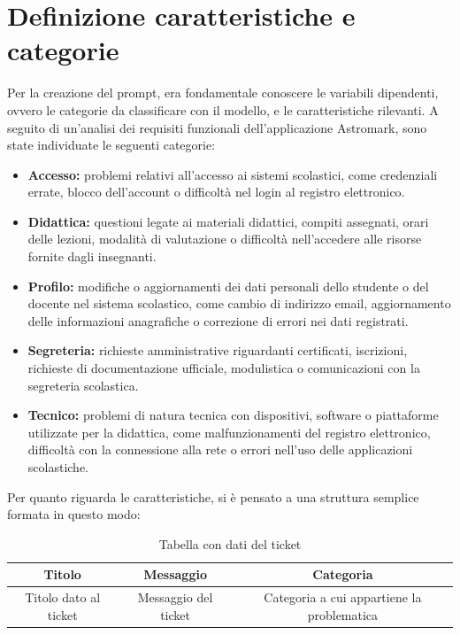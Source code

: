 \section{Definizione caratteristiche e categorie}
Per la creazione del prompt, era fondamentale conoscere le variabili dipendenti, ovvero le categorie da classificare con il modello, e le caratteristiche rilevanti. A seguito di un'analisi dei requisiti funzionali dell'applicazione Astromark, sono state individuate le seguenti categorie:
\begin{itemize}
    \item \textbf{Accesso:} problemi relativi all'accesso ai sistemi scolastici, come credenziali errate, blocco dell'account o difficoltà nel login al registro elettronico.
    \item \textbf{Didattica:} questioni legate ai materiali didattici, compiti assegnati, orari delle lezioni, modalità di valutazione o difficoltà nell'accedere alle risorse fornite dagli insegnanti.
    \item \textbf{Profilo:} modifiche o aggiornamenti dei dati personali dello studente o del docente nel sistema scolastico, come cambio di indirizzo email, aggiornamento delle informazioni anagrafiche o correzione di errori nei dati registrati.
    \item \textbf{Segreteria:}  richieste amministrative riguardanti certificati, iscrizioni, richieste di documentazione ufficiale, modulistica o comunicazioni con la segreteria scolastica.
    \item \textbf{Tecnico:} problemi di natura tecnica con dispositivi, software o piattaforme utilizzate per la didattica, come malfunzionamenti del registro elettronico, difficoltà con la connessione alla rete o errori nell'uso delle applicazioni scolastiche.
\end{itemize}
Per quanto riguarda le caratteristiche, si è pensato a una struttura semplice formata in questo modo:
\begin{table}[h]
    \centering
    \begin{tabular}{|c|c|c|}
        \hline
        \textbf{Titolo} & \textbf{Messaggio} & \textbf{Categoria} \\
        \hline
        Titolo dato al ticket & Messaggio del ticket & Categoria a cui appartiene la problematica \\
        \hline
    \end{tabular}
    \caption{Tabella con dati del ticket}
    \label{tab:tickets}
\end{table}

